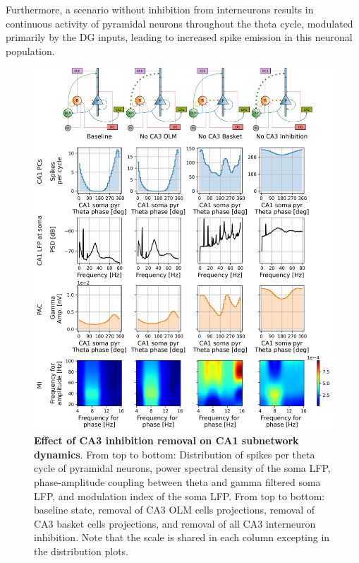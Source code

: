 \documentclass[../main.tex]{subfiles}
\begin{document}
Furthermore, a scenario without inhibition from interneurons results in continuous activity of pyramidal neurons throughout the theta cycle, modulated primarily by the DG inputs, leading to increased spike emission in this neuronal population.
\begin{figure}[!htbp]
    \centering
    \includegraphics[width=\textwidth]{chapter4/figures/removing_interneurons/removing_interneurons_ca1_v1_lfp.png}
    \caption{\textbf{Effect of CA3 inhibition removal on CA1 subnetwork dynamics}.
    From top to bottom: Distribution of spikes per theta cycle of pyramidal neurons, power spectral density  of the soma LFP, phase-amplitude coupling between theta and gamma filtered soma LFP, and modulation index of the soma LFP.
    From top to bottom: baseline state, removal of CA3 OLM cells projections, removal of CA3 basket cells projections, and removal of all CA3 interneuron inhibition.
    Note that the scale is shared in each column excepting in the distribution plots.}
    \label{fig:no-inhibition-ca1-1}
\end{figure}
\end{document}
